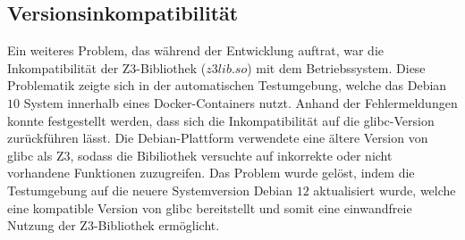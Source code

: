 \subsection{Versionsinkompatibilität}

Ein weiteres Problem, das während der Entwicklung auftrat, war die Inkompatibilität der Z3-Bibliothek ($z3lib.so$) mit dem Betriebssystem.
Diese Problematik zeigte sich in der automatischen Testumgebung, welche das Debian $10$ System innerhalb eines Docker-Containers nutzt.
Anhand der Fehlermeldungen konnte festgestellt werden, dass sich die Inkompatibilität auf die glibc-Version zurückführen lässt.
Die Debian-Plattform verwendete eine ältere Version von glibc als Z3, sodass die Bibiliothek versuchte auf inkorrekte oder nicht vorhandene Funktionen zuzugreifen.
Das Problem wurde gelöst, indem die Testumgebung auf die neuere Systemversion Debian $12$ aktualisiert wurde,
welche eine kompatible Version von glibc bereitstellt und somit eine einwandfreie Nutzung der Z3-Bibliothek ermöglicht.
